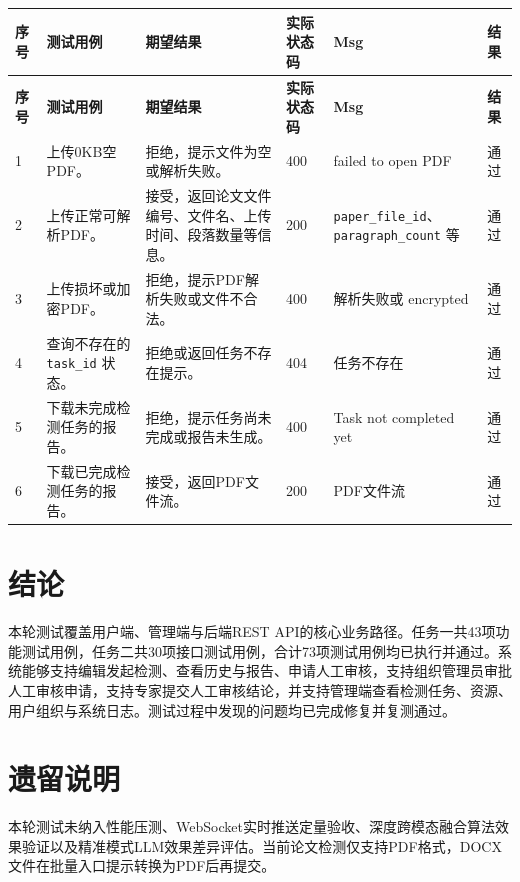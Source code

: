 \documentclass[UTF8,a4paper,12pt]{ctexart}
\newcommand{\pass}{通过}
\begin{document}
\begin{longtable}{|P{0.8cm}|P{4.2cm}|P{4.0cm}|P{1.4cm}|P{4.3cm}|P{1.0cm}|}
\hline
\textbf{序号} & \textbf{测试用例} & \textbf{期望结果} & \textbf{实际状态码} & \textbf{Msg} & \textbf{结果} \\
\hline
\endfirsthead

\hline
\textbf{序号} & \textbf{测试用例} & \textbf{期望结果} & \textbf{实际状态码} & \textbf{Msg} & \textbf{结果} \\
\hline
\endhead

1 & 上传0KB空PDF。 & 拒绝，提示文件为空或解析失败。 & 400 & failed to open PDF & \pass \\
\hline

2 & 上传正常可解析PDF。 & 接受，返回论文文件编号、文件名、上传时间、段落数量等信息。 & 200 & \texttt{paper\_file\_id}、\texttt{paragraph\_count} 等 & \pass \\
\hline

3 & 上传损坏或加密PDF。 & 拒绝，提示PDF解析失败或文件不合法。 & 400 & 解析失败或 encrypted & \pass \\
\hline

4 & 查询不存在的 \texttt{task\_id} 状态。 & 拒绝或返回任务不存在提示。 & 404 & 任务不存在 & \pass \\
\hline

5 & 下载未完成检测任务的报告。 & 拒绝，提示任务尚未完成或报告未生成。 & 400 & Task not completed yet & \pass \\
\hline

6 & 下载已完成检测任务的报告。 & 接受，返回PDF文件流。 & 200 & PDF文件流 & \pass \\
\hline

\end{longtable}

\section*{结论}

本轮测试覆盖用户端、管理端与后端REST API的核心业务路径。任务一共43项功能测试用例，任务二共30项接口测试用例，合计73项测试用例均已执行并通过。系统能够支持编辑发起检测、查看历史与报告、申请人工审核，支持组织管理员审批人工审核申请，支持专家提交人工审核结论，并支持管理端查看检测任务、资源、用户组织与系统日志。测试过程中发现的问题均已完成修复并复测通过。

\section*{遗留说明}

本轮测试未纳入性能压测、WebSocket实时推送定量验收、深度跨模态融合算法效果验证以及精准模式LLM效果差异评估。当前论文检测仅支持PDF格式，DOCX文件在批量入口提示转换为PDF后再提交。
\end{document}
